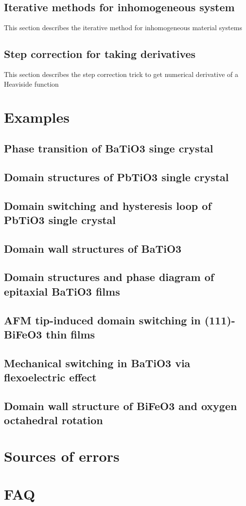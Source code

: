 \documentclass{article}
\begin{document}
\subsection{Iterative methods for inhomogeneous system}
This section describes the iterative method for inhomogeneous material systems 

\subsection{Step correction for taking derivatives}
This section describes the step correction trick to get numerical derivative of a Heaviside function 

\section{Examples}
\subsection{Phase transition of BaTiO3 singe crystal}
\subsection{Domain structures of PbTiO3 single crystal}
\subsection{Domain switching and hysteresis loop of PbTiO3 single crystal}
\subsection{Domain wall structures of BaTiO3}
\subsection{Domain structures and phase diagram of epitaxial BaTiO3 films}
\subsection{AFM tip-induced domain switching in (111)-BiFeO3 thin films}
\subsection{Mechanical switching in BaTiO3 via flexoelectric effect}
\subsection{Domain wall structure of BiFeO3 and oxygen octahedral rotation}

\section{Sources of errors}
\section{FAQ}
\end{document}
